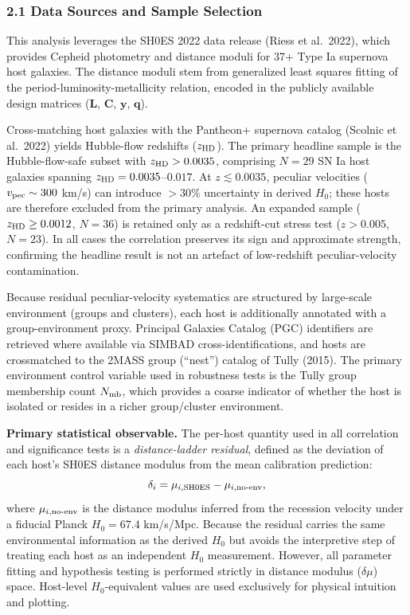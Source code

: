 \documentclass[
]{article}
\begin{document}
\subsubsection{2.1 Data Sources and Sample
Selection}\label{data-sources-and-sample-selection}

This analysis leverages the SH0ES 2022 data release (Riess et al.~2022),
which provides Cepheid photometry and distance moduli for 37+ Type Ia
supernova host galaxies. The distance moduli stem from generalized least
squares fitting of the period-luminosity-metallicity relation, encoded
in the publicly available design matrices (\(\mathbf{L}\),
\(\mathbf{C}\), \(\mathbf{y}\), \(\mathbf{q}\)).

Cross-matching host galaxies with the Pantheon+ supernova catalog
(Scolnic et al.~2022) yields Hubble-flow redshifts (\(z_{\rm HD}\)). The
primary headline sample is the Hubble-flow-safe subset with
\(z_{\rm HD} > 0.0035\), comprising \(N=29\) SN Ia host galaxies
spanning \(z_{\rm HD} = 0.0035\)--\(0.017\). At \(z \lesssim 0.0035\),
peculiar velocities (\(v_{\rm pec} \sim 300\) km/s) can introduce
\(>30\%\) uncertainty in derived \(H_0\); these hosts are therefore
excluded from the primary analysis. An expanded sample
(\(z_{\rm HD} \geq 0.0012\), \(N=36\)) is retained only as a
redshift-cut stress test (\(z > 0.005\), \(N=23\)). In all cases the
correlation preserves its sign and approximate strength, confirming the
headline result is not an artefact of low-redshift peculiar-velocity
contamination.

Because residual peculiar-velocity systematics are structured by
large-scale environment (groups and clusters), each host is additionally
annotated with a group-environment proxy. Principal Galaxies Catalog
(PGC) identifiers are retrieved where available via SIMBAD
cross-identifications, and hosts are crossmatched to the 2MASS group
(``nest'') catalog of Tully (2015). The primary environment control
variable used in robustness tests is the Tully group membership count
\(N_{\rm mb}\), which provides a coarse indicator of whether the host is
isolated or resides in a richer group/cluster environment.

\textbf{Primary statistical observable.} The per-host quantity used in
all correlation and significance tests is a \emph{distance-ladder
residual}, defined as the deviation of each host's SH0ES distance
modulus from the mean calibration prediction: \begin{equation}
\delta_i = \mu_{i,\rm SH0ES} - \mu_{i,\rm no\text{-}env} ,
\end{equation} where \(\mu_{i,\rm no\text{-}env}\) is the distance
modulus inferred from the recession velocity under a fiducial Planck
\(H_0 = 67.4\) km/s/Mpc. Because the residual carries the same
environmental information as the derived \(H_0\) but avoids the
interpretive step of treating each host as an independent \(H_0\)
measurement. However, all parameter fitting and hypothesis testing is
performed strictly in distance modulus (\(\delta\mu\)) space. Host-level
\(H_0\)-equivalent values are used exclusively for physical intuition
and plotting.
\end{document}

